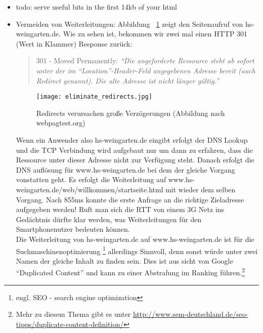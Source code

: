 \begin{itemize}
			\item todo: serve useful bits in the first 14kb of your html

			\item Vermeiden von Weiterleitungen: Abbildung ~\ref{fig:eliminate_redirects} zeigt den Seitenaufruf von hs-weingarten.de. Wie zu sehen ist, bekommen wir zwei mal einen HTTP 301 (Wert in Klammer) Response zurück: 

			\begin{quote}
				301 - Moved Permanently: \textit{"`Die angeforderte Ressource steht ab sofort unter der im "`Location"'-Header-Feld angegebenen Adresse bereit (auch Redirect genannt). Die alte Adresse ist nicht länger gültig."'} \autocite{wikipediaHTTP}
			\end{quote}

			\begin{figure}[htbp]
				\begin{center}
					\texttt{[image: eliminate\_redirects.jpg]}
					\caption{Redirects verursachen große Verzögerungen (Abbildung nach webpagtest.org)}
					\label{fig:eliminate_redirects}
				\end{center}
			\end{figure}
			
			Wenn ein Anwender also hs-weingarten.de eingibt erfolgt der DNS Lookup und die TCP Verbindung wird aufgebaut nur um dann zu erfahren, dass die Ressource unter dieser Adresse nicht zur Verfügung steht. Danach erfolgt die DNS auflösung für www.hs-weingarten.de bei dem der gleiche Vorgang vonstatten geht. Es erfolgt die Weiterleitung auf www.hs-weingarten.de/web/willkommen/startseite.html mit wieder dem selben Vorgang.	Nach 855ms konnte die erste Anfrage an die richtige Zieladresse aufgegeben werden! Ruft man sich die RTT von einem 3G Netz ins Gedächtnis dürfte klar werden, was Weiterleitungen für den Smartphonenutzer bedeuten können. \\

			Die Weiterleitung von hs-weingarten.de auf www.hs-weingarten.de ist für die Suchmaschinenoptimierung \footnote{engl. SEO - search engine optimization} allerdings Sinnvoll, denn sonst würde unter zwei Namen der gleiche Inhalt zu finden sein. Dies ist aus sicht von Google "`Duplicated Content"' und kann zu einer Abstrafung im Ranking führen.\footnote{Mehr zu diesem Thema gibt es unter \url{http://www.sem-deutschland.de/seo-tipps/duplicate-content-definition/}}

		\end{itemize}

